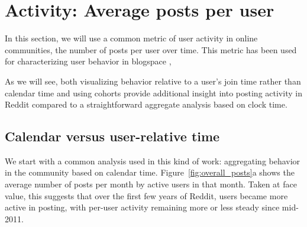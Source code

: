 \section{Activity: Average posts per user}

\begin{figure*}[!tb]
\centering
{}
\caption{In Figure (a), monthly average posts per active user over clock time. In Figure (b), the monthly average posts per active users in the user-time referential, i.e., message creation time is measured relative to the user's first post.  Each tick in the x-axis is one year.  In both figures (and all later figures), we consider only active users during each month; users that are either temporarily or permanently away from Reddit are not included.}
\label{fig:overall_posts}
\end{figure*}

In this section, we will use a common metric of user activity in online communities, the number of posts per user over time.  This metric has been used for characterizing user behavior in blogspace \cite{Gruhl2004}, 

As we will see, both visualizing behavior relative to a user's join time rather than calendar time and using cohorts provide additional insight into posting activity in Reddit compared to a straightforward aggregate analysis based on clock time.

\subsection{Calendar versus user-relative time}

We start with a common analysis used in this kind of work: aggregating behavior in the community based on calendar time.  Figure~\ref{fig:overall_posts}a shows the average number of posts per month by active users in that month.  Taken at face value, this suggests that over the first few years of Reddit, users became more active in posting, with per-user activity remaining more or less steady since mid-2011.

